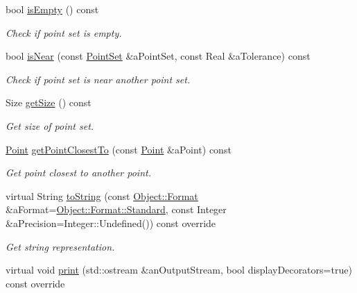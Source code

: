 \begin{DoxyCompactItemize}
bool \hyperlink{classostk_1_1math_1_1geom_1_1d2_1_1objects_1_1_point_set_a1df6b975efcbfc495dbdc947dc632846}{is\+Empty} () const
\begin{DoxyCompactList}\small\item\em Check if point set is empty. \end{DoxyCompactList}\item 
bool \hyperlink{classostk_1_1math_1_1geom_1_1d2_1_1objects_1_1_point_set_ab11988a5a567985298249b3e8d30842b}{is\+Near} (const \hyperlink{classostk_1_1math_1_1geom_1_1d2_1_1objects_1_1_point_set}{Point\+Set} \&a\+Point\+Set, const Real \&a\+Tolerance) const
\begin{DoxyCompactList}\small\item\em Check if point set is near another point set. \end{DoxyCompactList}\item 
Size \hyperlink{classostk_1_1math_1_1geom_1_1d2_1_1objects_1_1_point_set_a169dfd11b6bd2e162f1ceb632ee19508}{get\+Size} () const
\begin{DoxyCompactList}\small\item\em Get size of point set. \end{DoxyCompactList}\item 
\hyperlink{classostk_1_1math_1_1geom_1_1d2_1_1objects_1_1_point}{Point} \hyperlink{classostk_1_1math_1_1geom_1_1d2_1_1objects_1_1_point_set_a1d08aa1b16ad2865f09a25267c63e58b}{get\+Point\+Closest\+To} (const \hyperlink{classostk_1_1math_1_1geom_1_1d2_1_1objects_1_1_point}{Point} \&a\+Point) const
\begin{DoxyCompactList}\small\item\em Get point closest to another point. \end{DoxyCompactList}\item 
virtual String \hyperlink{classostk_1_1math_1_1geom_1_1d2_1_1objects_1_1_point_set_af032e86d9d9dcabe229a015a8361daf2}{to\+String} (const \hyperlink{classostk_1_1math_1_1geom_1_1d2_1_1_object_aa76f9e30caebf4005bafbdff447f66cf}{Object\+::\+Format} \&a\+Format=\hyperlink{classostk_1_1math_1_1geom_1_1d2_1_1_object_aa76f9e30caebf4005bafbdff447f66cfaeb6d8ae6f20283755b339c0dc273988b}{Object\+::\+Format\+::\+Standard}, const Integer \&a\+Precision=Integer\+::\+Undefined()) const override
\begin{DoxyCompactList}\small\item\em Get string representation. \end{DoxyCompactList}\item 
virtual void \hyperlink{classostk_1_1math_1_1geom_1_1d2_1_1objects_1_1_point_set_aef3263b63b2e9c9667365f58faee9ac7}{print} (std\+::ostream \&an\+Output\+Stream, bool display\+Decorators=true) const override

\end{DoxyCompactItemize}
